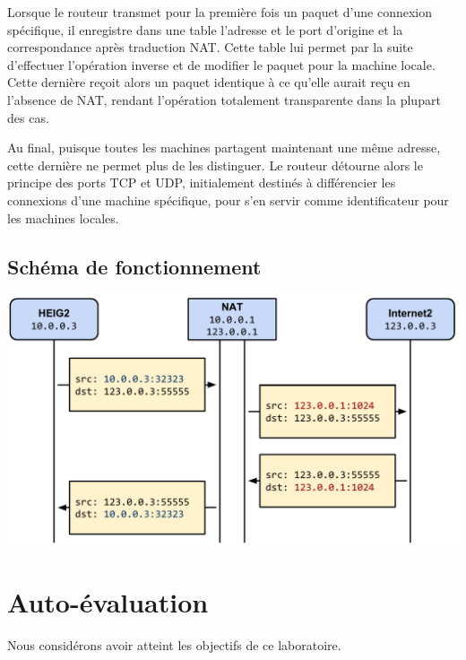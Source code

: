 \documentclass[11pt,a4paper]{article}
\begin{document}
Lorsque le routeur transmet pour la première fois un paquet d'une connexion spécifique, il enregistre dans une table l'adresse et le port d'origine et la correspondance après traduction NAT. Cette table lui permet par la suite d'effectuer l'opération inverse et de modifier le paquet pour la machine locale. Cette dernière reçoit alors un paquet identique à ce qu'elle aurait reçu en l'absence de NAT, rendant l'opération totalement transparente dans la plupart des cas. 

Au final, puisque toutes les machines partagent maintenant une même adresse, cette dernière ne permet plus de les distinguer. Le routeur détourne alors le principe des ports TCP et UDP, initialement destinés à différencier les connexions d'une machine spécifique, pour s'en servir comme identificateur pour les machines locales.

\subsection{Schéma de fonctionnement}

\begin{center}
\includegraphics[width=15cm]{img_nat}
\end{center}

\section{Auto-évaluation}

Nous considérons avoir atteint les objectifs de ce laboratoire.
\end{document}
